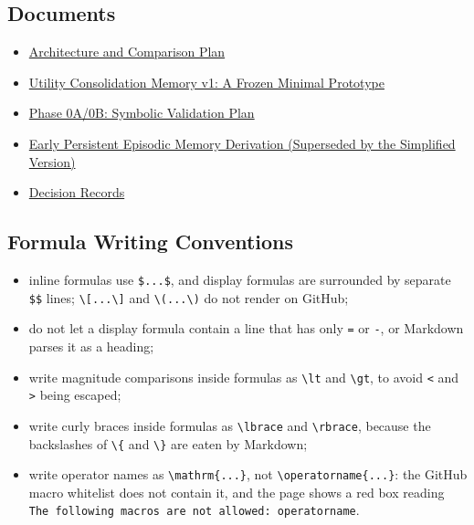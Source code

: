 \subsection{Documents}

\begin{itemize}
  \item \href{docs/en/architecture-comparison-plan.md}{Architecture and Comparison Plan}
  \item \href{docs/en/utility-consolidation-memory-v1.md}{Utility Consolidation Memory v1: A Frozen Minimal Prototype}
  \item \href{docs/en/phase0-ab-validation.md}{Phase 0A/0B: Symbolic Validation Plan}
  \item \href{docs/en/candidate-persistent-episodic-memory.md}{Early Persistent Episodic Memory Derivation (Superseded by the Simplified Version)}
  \item \href{docs/en/decisions.md}{Decision Records}
\end{itemize}

\subsection{Formula Writing Conventions}

\begin{itemize}
  \item inline formulas use \texttt{\$...\$}, and display formulas are surrounded by separate \texttt{\$\$} lines; \texttt{\textbackslash{}[...\textbackslash{}]} and \texttt{\textbackslash{}(...\textbackslash{})} do not render on GitHub;
  \item do not let a display formula contain a line that has only \texttt{=} or \texttt{-}, or Markdown parses it as a heading;
  \item write magnitude comparisons inside formulas as \texttt{\textbackslash{}lt} and \texttt{\textbackslash{}gt}, to avoid \texttt{<} and \texttt{>} being escaped;
  \item write curly braces inside formulas as \texttt{\textbackslash{}lbrace} and \texttt{\textbackslash{}rbrace}, because the backslashes of \texttt{\textbackslash{}\{} and \texttt{\textbackslash{}\}} are eaten by Markdown;
  \item write operator names as \texttt{\textbackslash{}mathrm\{...\}}, not \texttt{\textbackslash{}operatorname\{...\}}: the GitHub macro whitelist does not contain it, and the page shows a red box reading \texttt{The following macros are not allowed: operatorname}.
\end{itemize}

